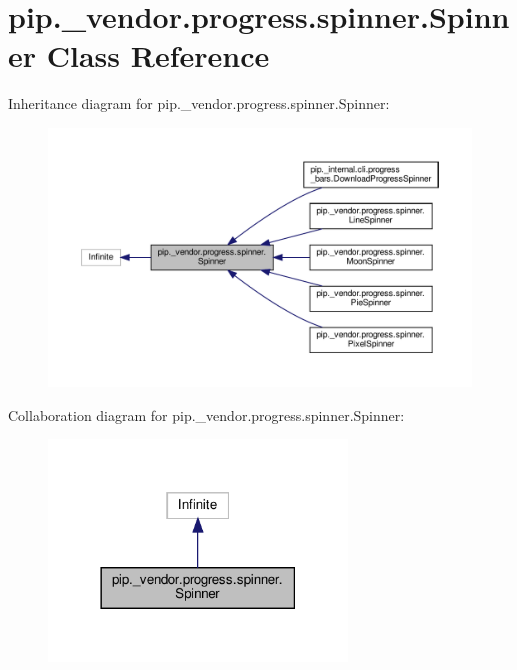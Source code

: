 \hypertarget{classpip_1_1__vendor_1_1progress_1_1spinner_1_1Spinner}{}\section{pip.\+\_\+vendor.\+progress.\+spinner.\+Spinner Class Reference}
\label{classpip_1_1__vendor_1_1progress_1_1spinner_1_1Spinner}


Inheritance diagram for pip.\+\_\+vendor.\+progress.\+spinner.\+Spinner\+:
\nopagebreak
\begin{figure}[H]
\begin{center}
\leavevmode
\includegraphics[width=350pt]{classpip_1_1__vendor_1_1progress_1_1spinner_1_1Spinner__inherit__graph}
\end{center}
\end{figure}


Collaboration diagram for pip.\+\_\+vendor.\+progress.\+spinner.\+Spinner\+:
\nopagebreak
\begin{figure}[H]
\begin{center}
\leavevmode
\includegraphics[width=225pt]{classpip_1_1__vendor_1_1progress_1_1spinner_1_1Spinner__coll__graph}
\end{center}
\end{figure}
